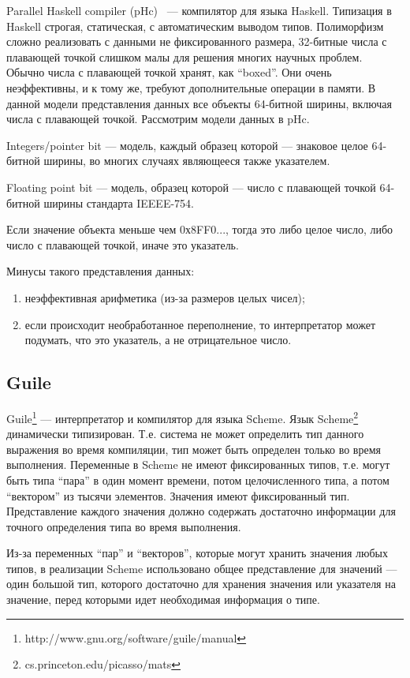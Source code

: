 Parallel Haskell compiler (pHc)~\cite{pHc} — компилятор для языка Haskell.
Типизация в Haskell строгая, статическая, с автоматическим выводом типов.
Полиморфизм сложно реализовать с данными не фиксированного размера, 32-битные
числа с плавающей точкой слишком малы для решения многих научных проблем. Обычно
числа с плавающей точкой хранят, как ``boxed''. 
Они очень неэффективны, и к тому же, требуют дополнительные операции в памяти.
В данной модели представления данных все объекты 64-битной ширины, включая числа с плавающей точкой.
Рассмотрим модели данных в pHc.

Integers/pointer bit --- модель, каждый образец которой --- знаковое целое 64-битной ширины, 
во многих случаях являющееся также указателем.

Floating point bit --- модель, образец которой --- число с плавающей точкой 64-битной ширины стандарта IEEEE-754.

Если значение объекта меньше чем 0х8FF0..., тогда это либо целое число, либо число с плавающей точкой,
иначе это указатель.

Минусы такого представления данных: 
\begin{enumerate}
\item неэффективная арифметика (из-за размеров целых чисел);
\item если происходит необработанное переполнение, то интерпретатор может 
подумать, что это указатель, а не отрицательное число.
\end{enumerate}

\subsection {Guile}

Guile\footnote{http://www.gnu.org/software/guile/manual} --- интерпретатор и компилятор для языка Sсheme.
Язык Scheme\footnote{cs.princeton.edu/picasso/mats} динамически типизирован.
Т.е. система не может определить тип данного выражения во время компиляции, тип может быть определен только во время выполнения.
Переменные в Scheme не имеют фиксированных типов, т.е. могут быть
типа ``пара'' в один момент времени, потом целочисленного типа, а потом ``вектором'' из тысячи элементов. Значения
имеют фиксированный тип. Представление каждого значения должно содержать достаточно
информации для точного определения типа во время выполнения.

Из-за переменных ``пар'' и ``векторов'', которые могут хранить значения любых типов,
в реализации Scheme использовано общее представление для значений ---
один большой тип, которого достаточно для хранения значения или указателя на значение,
перед которыми идет необходимая информация о типе.


